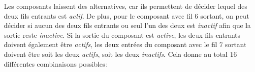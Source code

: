 \documentclass[a4paper,11pt]{report}
\newcommand{\taskGraphicsFolder}{..}
\begin{document}
Les composants \raisebox{\dimexpr -0.5ex -0.6ex \relax}{} laissent des alternatives, car ils permettent de décider lequel des deux fils entrants est \emph{actif}. De plus, pour le composant \raisebox{\dimexpr -0.5ex -0.6ex \relax}{} avec fil $6$ sortant, on peut décider si aucun des deux fils entrants ou seul l’un des deux est \emph{inactif} afin que la sortie reste \emph{inactive}. Si la sortie du composant \raisebox{\dimexpr -0.5ex -0.6ex \relax}{} est \emph{active}, les deux fils entrants doivent également être \emph{actifs}, les deux entrées du composant \raisebox{\dimexpr -0.5ex -0.6ex \relax}{} avec le fil $7$ sortant doivent être soit les deux \emph{actifs}, soit les deux \emph{inactifs}. Cela donne au total $16$ différentes combinaisons possibles:
\end{document}
